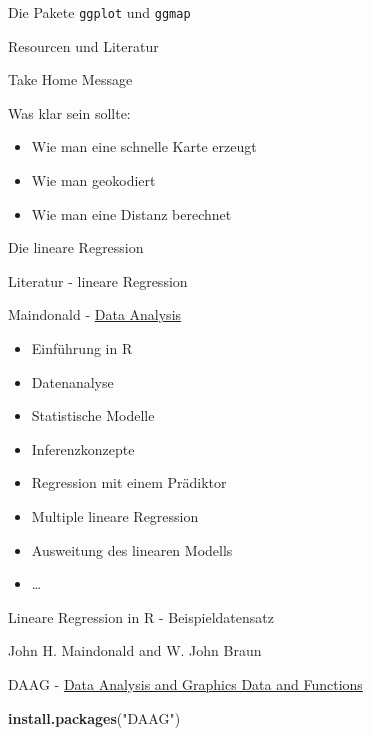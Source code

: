 \documentclass[ignorenonframetext,]{beamer}
\newenvironment{Shaded}{}{}
\newcommand{\KeywordTok}[1]{\textcolor[rgb]{0.00,0.44,0.13}{\textbf{{#1}}}}
\newcommand{\StringTok}[1]{\textcolor[rgb]{0.25,0.44,0.63}{{#1}}}
\newcommand{\NormalTok}[1]{{#1}}
\providecommand{\tightlist}{%
\setlength{\itemsep}{0pt}\setlength{\parskip}{0pt}}
\begin{document}
\begin{frame}[fragile]{Die Pakete \texttt{ggplot} und \texttt{ggmap}}
\begin{block}{Resourcen und Literatur}
\end{block}

\begin{block}{Take Home Message}

Was klar sein sollte:

\begin{itemize}
\tightlist
\item
  Wie man eine schnelle Karte erzeugt
\item
  Wie man geokodiert
\item
  Wie man eine Distanz berechnet
\end{itemize}

\end{block}

\end{frame}

\begin{frame}[fragile]{Die lineare Regression}

\begin{block}{Literatur - lineare Regression}

Maindonald -
\href{https://cran.r-project.org/doc/contrib/usingR.pdf}{Data Analysis}

\begin{itemize}
\tightlist
\item
  Einführung in R
\item
  Datenanalyse
\item
  Statistische Modelle
\item
  Inferenzkonzepte
\item
  Regression mit einem Prädiktor
\item
  Multiple lineare Regression
\item
  Ausweitung des linearen Modells
\item
  \ldots{}
\end{itemize}

\end{block}

\begin{block}{Lineare Regression in R - Beispieldatensatz}

John H. Maindonald and W. John Braun

DAAG -
\href{http://cran.ms.unimelb.edu.au/web/packages/DAAG/DAAG.pdf}{Data
Analysis and Graphics Data and Functions}

\begin{Shaded}
\begin{Highlighting}[]
\KeywordTok{install.packages}\NormalTok{(}\StringTok{"DAAG"}\NormalTok{)}
\end{Highlighting}
\end{Shaded}


\end{block}
\end{frame}
\end{document}
